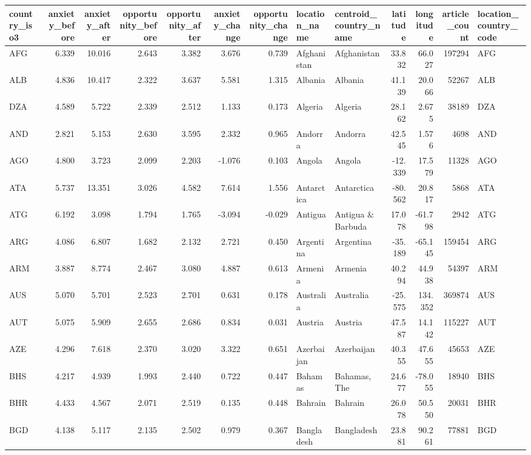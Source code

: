 \begin{tabular}{lrrrrrrllrrrl}
\toprule
country\_iso3 & anxiety\_before & anxiety\_after & opportunity\_before & opportunity\_after & anxiety\_change & opportunity\_change & location\_name & centroid\_country\_name & latitude & longitude & article\_count & location\_country\_code \\
\midrule
AFG & 6.339 & 10.016 & 2.643 & 3.382 & 3.676 & 0.739 & Afghanistan & Afghanistan & 33.832 & 66.027 & 197294 & AFG \\
ALB & 4.836 & 10.417 & 2.322 & 3.637 & 5.581 & 1.315 & Albania & Albania & 41.139 & 20.066 & 52267 & ALB \\
DZA & 4.589 & 5.722 & 2.339 & 2.512 & 1.133 & 0.173 & Algeria & Algeria & 28.162 & 2.675 & 38189 & DZA \\
AND & 2.821 & 5.153 & 2.630 & 3.595 & 2.332 & 0.965 & Andorra & Andorra & 42.545 & 1.576 & 4698 & AND \\
AGO & 4.800 & 3.723 & 2.099 & 2.203 & -1.076 & 0.103 & Angola & Angola & -12.339 & 17.579 & 11328 & AGO \\
ATA & 5.737 & 13.351 & 3.026 & 4.582 & 7.614 & 1.556 & Antarctica & Antarctica & -80.562 & 20.817 & 5868 & ATA \\
ATG & 6.192 & 3.098 & 1.794 & 1.765 & -3.094 & -0.029 & Antigua & Antigua \& Barbuda & 17.078 & -61.798 & 2942 & ATG \\
ARG & 4.086 & 6.807 & 1.682 & 2.132 & 2.721 & 0.450 & Argentina & Argentina & -35.189 & -65.145 & 159454 & ARG \\
ARM & 3.887 & 8.774 & 2.467 & 3.080 & 4.887 & 0.613 & Armenia & Armenia & 40.294 & 44.938 & 54397 & ARM \\
AUS & 5.070 & 5.701 & 2.523 & 2.701 & 0.631 & 0.178 & Australia & Australia & -25.575 & 134.352 & 369874 & AUS \\
AUT & 5.075 & 5.909 & 2.655 & 2.686 & 0.834 & 0.031 & Austria & Austria & 47.587 & 14.142 & 115227 & AUT \\
AZE & 4.296 & 7.618 & 2.370 & 3.020 & 3.322 & 0.651 & Azerbaijan & Azerbaijan & 40.355 & 47.655 & 45653 & AZE \\
BHS & 4.217 & 4.939 & 1.993 & 2.440 & 0.722 & 0.447 & Bahamas & Bahamas, The & 24.677 & -78.055 & 18940 & BHS \\
BHR & 4.433 & 4.567 & 2.071 & 2.519 & 0.135 & 0.448 & Bahrain & Bahrain & 26.078 & 50.550 & 20031 & BHR \\
BGD & 4.138 & 5.117 & 2.135 & 2.502 & 0.979 & 0.367 & Bangladesh & Bangladesh & 23.881 & 90.261 & 77881 & BGD \\

\end{tabular}
